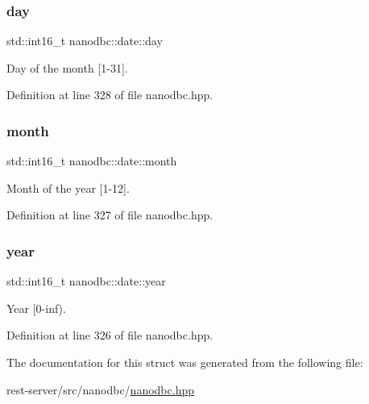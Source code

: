 \subsubsection{\texorpdfstring{day}{day}}
{\footnotesize\ttfamily std\+::int16\+\_\+t nanodbc\+::date\+::day}



Day of the month \mbox{[}1-\/31\mbox{]}. 



Definition at line 328 of file nanodbc.\+hpp.

\mbox{\label{structnanodbc_1_1date_a041c454a0d601ee4467e50267f02a297}} 
\subsubsection{\texorpdfstring{month}{month}}
{\footnotesize\ttfamily std\+::int16\+\_\+t nanodbc\+::date\+::month}



Month of the year \mbox{[}1-\/12\mbox{]}. 



Definition at line 327 of file nanodbc.\+hpp.

\mbox{\label{structnanodbc_1_1date_ae394db699ea928e8c022eafa1ed0acb2}} 
\subsubsection{\texorpdfstring{year}{year}}
{\footnotesize\ttfamily std\+::int16\+\_\+t nanodbc\+::date\+::year}



Year \mbox{[}0-\/inf). 



Definition at line 326 of file nanodbc.\+hpp.



The documentation for this struct was generated from the following file\+:\begin{DoxyCompactItemize}
\item 
rest-\/server/src/nanodbc/\mbox{\hyperlink{nanodbc_8hpp}{nanodbc.\+hpp}}\end{DoxyCompactItemize}
